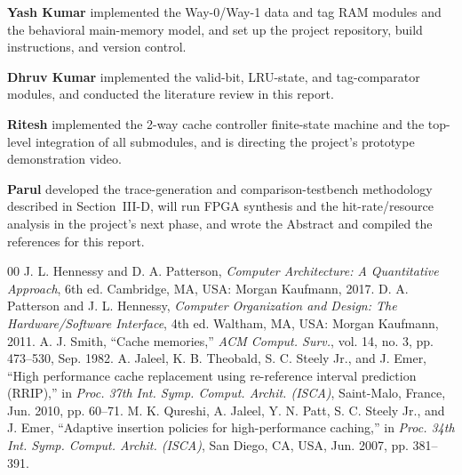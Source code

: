 \documentclass[conference]{IEEEtran}
\begin{document}
\textbf{Yash Kumar} implemented the Way-0/Way-1 data and tag RAM modules and the behavioral main-memory model, and set up the project repository, build instructions, and version control.

\textbf{Dhruv Kumar} implemented the valid-bit, LRU-state, and tag-comparator modules, and conducted the literature review in this report.

\textbf{Ritesh} implemented the 2-way cache controller finite-state machine and the top-level integration of all submodules, and is directing the project's prototype demonstration video.

\textbf{Parul} developed the trace-generation and comparison-testbench methodology described in Section~III-D, will run FPGA synthesis and the hit-rate/resource analysis in the project's next phase, and wrote the Abstract and compiled the references for this report.

\begin{thebibliography}{00}
 J. L. Hennessy and D. A. Patterson, \emph{Computer Architecture: A Quantitative Approach}, 6th ed. Cambridge, MA, USA: Morgan Kaufmann, 2017.
 D. A. Patterson and J. L. Hennessy, \emph{Computer Organization and Design: The Hardware/Software Interface}, 4th ed. Waltham, MA, USA: Morgan Kaufmann, 2011.
 A. J. Smith, ``Cache memories,'' \emph{ACM Comput. Surv.}, vol. 14, no. 3, pp. 473--530, Sep. 1982.
 A. Jaleel, K. B. Theobald, S. C. Steely Jr., and J. Emer, ``High performance cache replacement using re-reference interval prediction (RRIP),'' in \emph{Proc. 37th Int. Symp. Comput. Archit. (ISCA)}, Saint-Malo, France, Jun. 2010, pp. 60--71.
 M. K. Qureshi, A. Jaleel, Y. N. Patt, S. C. Steely Jr., and J. Emer, ``Adaptive insertion policies for high-performance caching,'' in \emph{Proc. 34th Int. Symp. Comput. Archit. (ISCA)}, San Diego, CA, USA, Jun. 2007, pp. 381--391.
\end{thebibliography}
\end{document}
